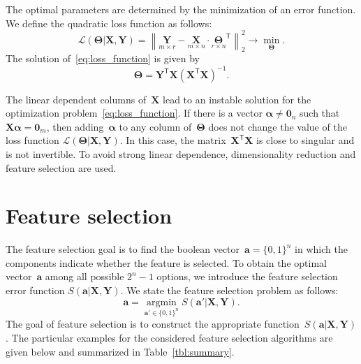 \documentclass[12pt,twoside]{article}
\theoremstyle{definition}
\newcommand{\ba}{\mathbf{a}}
\newcommand{\bY}{\mathbf{Y}}
\newcommand{\bX}{\mathbf{X}}
\newcommand{\T}{\mathsf{T}}
\newcommand{\bTheta}{\boldsymbol{\Theta}}
\newcommand{\bZero}{\boldsymbol{0}}
\newcommand{\argmin}{\mathop{\arg \min}\limits}
\begin{document}
The optimal parameters are determined by the minimization of an error function.
We define the quadratic loss function as follows:
\begin{equation}
\mathcal{L}(\bTheta | \bX, \bY) = {\left\| \underset{m \times r}{\mathbf{Y}}  - \underset{m \times n}{\bX} \cdot \underset{r \times n}{\bTheta}^{\T} \right\| }_2^2 \rightarrow\min_{\bTheta}.
\label{eq:loss_function}
\end{equation}
The solution of~\eqref{eq:loss_function} is given by
\begin{equation*}
\bTheta = \bY^{\T} \bX (\bX^{\T} \bX)^{-1}.
\end{equation*}

The linear dependent columns of~$\bX$ lead to an instable solution for the optimization problem~\eqref{eq:loss_function}.
If there is a vector $\boldsymbol{\alpha} \neq \bZero_n$ such that $\bX \boldsymbol{\alpha}= \bZero_m$, then adding~$\boldsymbol{\alpha}$ to any column of~$\bTheta$ does not change the value of the loss function $\mathcal{L}(\bTheta | \bX, \bY)$.
In this case, the matrix~$\bX^{\T} \bX$ is close to singular and is not invertible.
To avoid strong linear dependence, dimensionality reduction and feature selection are used.

\section{Feature selection}

The feature selection goal is to find the boolean vector~$\ba = \{0, 1\}^n$ in which the components indicate whether the feature is selected. 
To obtain the optimal vector~$\ba$ among all possible $2^n - 1$ options, we introduce the feature selection error function $S(\ba | \bX, \bY)$. 
We state the feature selection problem as follows:
\begin{equation}
\ba = \argmin_{\ba' \in \{0, 1\}^n} S(\ba' | \bX, \bY).
\label{eq:feature_selection}
\end{equation}
The goal of feature selection is to construct the appropriate function~$S(\ba | \bX, \bY)$. The particular examples for the considered feature selection algorithms are given below and summarized in Table~\ref{tbl:summary}.
\end{document}
